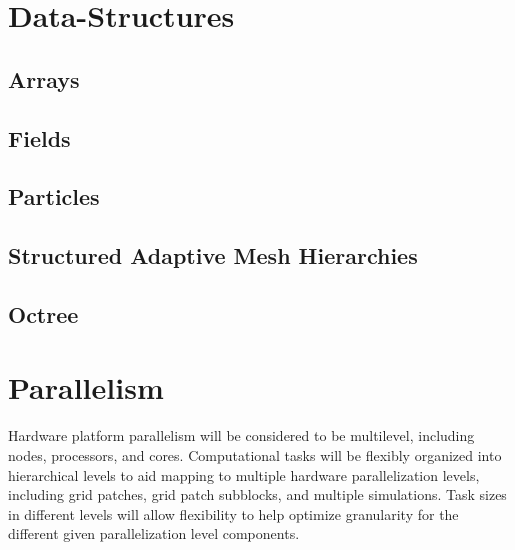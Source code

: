 \documentclass{book}
\begin{document}
\section{Data-Structures}

\subsection{Arrays}

\subsection{Fields}

\subsection{Particles}

\subsection{Structured Adaptive Mesh Hierarchies}

\subsection{Octree}

\section{Parallelism}

Hardware platform parallelism will be considered to be multilevel,
including nodes, processors, and cores.  Computational tasks will be
flexibly organized into hierarchical levels to aid mapping to multiple
hardware parallelization levels, including grid patches, grid patch
subblocks, and multiple simulations.  Task sizes in different levels
will allow flexibility to help optimize granularity for the different
given parallelization level components.
\end{document}
